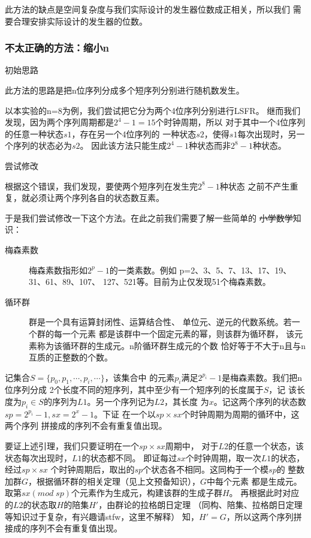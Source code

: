 \documentclass[12pt,a4paper,UTF8]{article}
\begin{document}
此方法的缺点是空间复杂度与我们实际设计的发生器位数成正相关，所以我们
需要合理安排实际设计的发生器的位数。

\subsubsection{不太正确的方法：缩小n}
{\noindent{\makebox[1em]{\textbullet}}\textsf{初始思路}}

此方法的思路是把n位序列分成多个短序列分别进行随机数发生。

以本实验的n=8为例，我们尝试把它分为两个4位序列分别进行LSFR。
继而我们发现，因为两个序列周期都是$2^4-1=15$个时钟周期，所以
对于其中一个4位序列的任意一种状态$s1$，存在另一个4位序列的
一种状态$s2$，使得$s1$每次出现时，另一个序列的状态必为$s2$。
因此该方法只能生成$2^4-1$种状态而非$2^8-1$种状态。

{\noindent{\makebox[1em]{\textbullet}}\textsf{尝试修改}}

根据这个错误，我们发现，要使两个短序列在发生完$2^8-1$种状态
之前不产生重复，就必须让两个序列各自的状态数互素。

于是我们尝试修改一下这个方法。在此之前我们需要了解一些简单的
\sout{小学数学}知识：
\begin{description}
  \item[梅森素数] 梅森素数指形如$2^p-1$的一类素数。例如
        p=2、3、5、7、13、17、19、31、61、89、107、
        127、521等。目前为止仅发现51个梅森素数。
  \item[循环群] 群是一个具有运算封闭性、运算结合性、
        单位元、逆元的代数系统。若一个群的每一个元素
        都是该群中一个固定元素的幂，则该群为循环群，
        该元素称为该循环群的生成元。n阶循环群生成元的个数
        恰好等于不大于n且与n互质的正整数的个数。
\end{description}
\hspace*{\fill}

记集合$S=\{p_0, p_1, \cdots , p_i, \cdots\}$，该集合中
的元素$p_i$满足$2^{p_i}-1$是梅森素数。我们把n位序列分成
2个长度不同的短序列，其中至少有一个短序列的长度属于$S$，记
该长度为$p_i\in S$的序列为$L1$。另一个序列记为$L2$，其长度
为$x$。记这两个序列的状态数$sp=2^{p_i}-1, sx=2^x-1$。下证
在一个以$sp\times sx$个时钟周期为周期的循环中，这两个序列
拼接成的序列不会有重复值出现。

要证上述引理，我们只要证明在一个$sp\times sx$周期中，
对于$L2$的任意一个状态，该状态每次出现时，$L1$的状态都不同。
即证每过$sx$个时钟周期，取一次$L1$的状态，经过$sp\times sx$
个时钟周期后，取出的$sp$个状态各不相同。这同构于一个模$sp$的
整数加群$G$，根据循环群的相关定理（见上文预备知识），$G$中每个元素
都是生成元。取第$sx(mod\; sp)$个元素作为生成元，构建该群的生成子群$H$。
再根据此时对应的$L2$的状态取$H$的陪集$H'$，由群论的拉格朗日定理
（同构、陪集、拉格朗日定理等知识过于复杂，有兴趣请stfw，这里不解释）
知，$H'=G$，所以这两个序列拼接成的序列不会有重复值出现。
\end{document}
